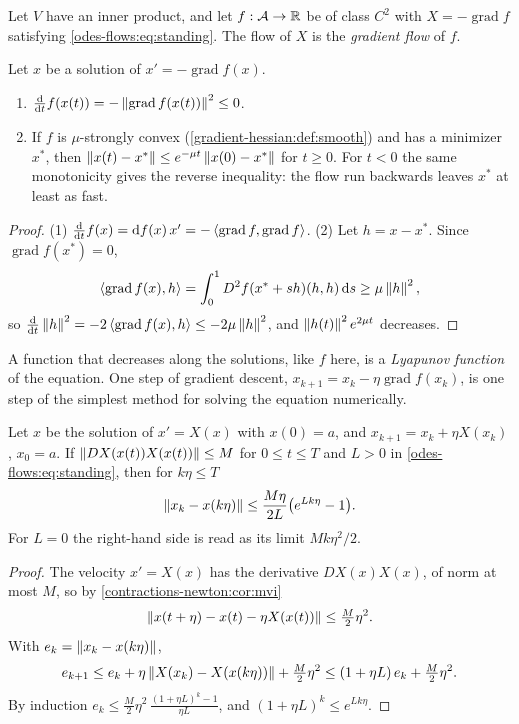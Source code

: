 \begin{notechapter}
Let $V$ have an inner product, and let $f:\mathcal{A}\to\mathbb{R}$ be of class
$C^2$ with $X = -\operatorname{grad}f$ satisfying
\eqref{odes-flows:eq:standing}. The flow of $X$ is the \emph{gradient
flow} of $f$.

\begin{proposition}\label{odes-flows:prop:gradient-flow}
Let $x$ be a solution of $x' = -\operatorname{grad}f(x)$.
\begin{enumerate}[nosep]
  \item $\frac{\mathrm{d}}{\mathrm{d} t}f(x(t))
        = -\left\|\operatorname{grad}f(x(t))\right\|^2\leq0$.
  \item If $f$ is $\mu$-strongly convex
        (\cref{gradient-hessian:def:smooth}) and has a minimizer
        $x^*$, then
        $\left\|x(t) - x^*\right\|\leq e^{-\mu t}\left\|x(0) - x^*\right\|$
        for $t\geq0$. For $t < 0$ the same monotonicity gives the
        reverse inequality: the flow run backwards leaves $x^*$ at
        least as fast.
\end{enumerate}
\end{proposition}

\begin{proof}
(1) $\frac{\mathrm{d}}{\mathrm{d} t}f(x) = \mathrm{d} f(x)\,x'
= -\left\langle \operatorname{grad}f, \operatorname{grad}f \right\rangle$. (2) Let
$h = x - x^*$. Since $\operatorname{grad}f(x^*) = 0$,
\[
  \left\langle \operatorname{grad}f(x), h \right\rangle
  = \int_0^1D^2f(x^* + sh)(h, h)\,\mathrm{d} s\geq\mu\left\|h\right\|^2 ,
\]
so $\frac{\mathrm{d}}{\mathrm{d} t}\left\|h\right\|^2 = -2\left\langle \operatorname{grad}f(x), h \right\rangle
\leq-2\mu\left\|h\right\|^2$, and $\left\|h(t)\right\|^2e^{2\mu t}$ decreases.
\end{proof}

A function that decreases along the solutions, like $f$ here, is a
\emph{Lyapunov function} of the equation. One step of gradient
descent, $x_{k+1} = x_k - \eta\operatorname{grad}f(x_k)$, is one step
of the simplest method for solving the equation numerically.

\begin{proposition}\label{odes-flows:prop:euler}
Let $x$ be the solution of $x' = X(x)$ with $x(0) = a$, and
$x_{k+1} = x_k + \eta X(x_k)$, $x_0 = a$. If
$\left\|DX(x(t))X(x(t))\right\|\leq M$ for $0\leq t\leq T$ and $L > 0$ in
\eqref{odes-flows:eq:standing}, then for $k\eta\leq T$
\[
  \left\|x_k - x(k\eta)\right\|\leq\frac{M\eta}{2L}\bigl(e^{Lk\eta} - 1\bigr) .
\]
For $L = 0$ the right-hand side is read as its limit $Mk\eta^2/2$.
\end{proposition}

\begin{proof}
The velocity $x' = X(x)$ has the derivative $DX(x)X(x)$, of norm at
most $M$, so by \cref{contractions-newton:cor:mvi}
\[
  \left\|x(t + \eta) - x(t) - \eta X(x(t))\right\|\leq\tfrac M2\eta^2 .
\]
With $e_k = \left\|x_k - x(k\eta)\right\|$,
\[
  e_{k+1}\leq e_k + \eta\left\|X(x_k) - X(x(k\eta))\right\| + \tfrac M2\eta^2
  \leq(1 + \eta L)\,e_k + \tfrac M2\eta^2 .
\]
By induction
$e_k\leq\frac M2\eta^2\,\frac{(1 + \eta L)^k - 1}{\eta L}$, and
$(1 + \eta L)^k\leq e^{Lk\eta}$.
\end{proof}


\end{notechapter}
